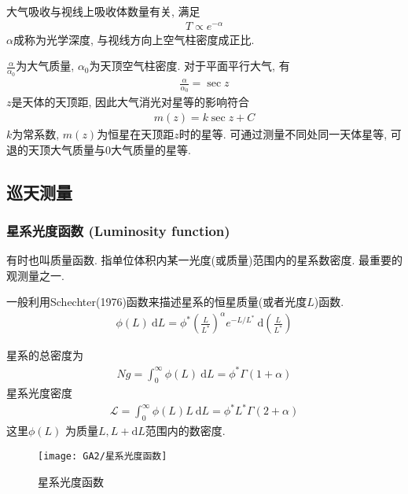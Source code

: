 大气吸收与视线上吸收体数量有关, 满足
\begin{align*}
    T \propto  e^{-\alpha}
\end{align*}
$\alpha$成称为光学深度, 与视线方向上空气柱密度成正比. 

$\frac{\alpha}{\alpha_0}$为大气质量, $\alpha_0$为天顶空气柱密度. 对于平面平行大气, 有
\begin{align*}
    \frac{\alpha}{\alpha_0}=\sec z
\end{align*}
$z$是天体的天顶距, 因此大气消光对星等的影响符合
\begin{align*}
    m(z)=k \sec z +C
\end{align*}
$k$为常系数, $m(z)$为恒星在天顶距$z$时的星等. 可通过测量不同处同一天体星等, 可退的天顶大气质量与0大气质量的星等. 

\subsection{巡天测量}

\subsubsection{星系光度函数 (Luminosity function)}
有时也叫质量函数. 指单位体积内某一光度(或质量)范围内的星系数密度. 最重要的观测量之一. 

一般利用Schechter(1976)函数来描述星系的恒星质量(或者光度$L$)函数. 
\begin{align*}
    \phi(L)\ \mathrm{d}L=\phi^*\left(\frac{L}{L^*}\right)^{\alpha}  e^{-L/L^*}\ \mathrm{d} \left(\frac{L}{L^*}\right)
\end{align*}

星系的总密度为
\begin{align*}
    Ng=\int_0^{\infty}\phi(L)\ \mathrm{d}L=\phi^*\Gamma (1+\alpha)
\end{align*}
星系光度密度
\begin{align*}
    \mathcal{L}=\int_0^{\infty}\phi(L)L\ \mathrm{d}L=\phi^* L^* \Gamma (2+\alpha)
\end{align*}
这里$\phi(L)$ 为质量$L, L+\mathrm{d}L$范围内的数密度. 

\begin{figure}[!htb]
    \centering
    \texttt{[image: GA2/星系光度函数]}
    \caption{星系光度函数}
\end{figure}

